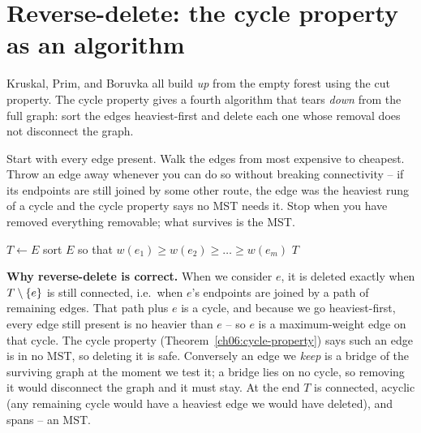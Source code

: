 \section{Reverse-delete: the cycle property as an algorithm}

Kruskal, Prim, and Boruvka all build \emph{up} from the empty forest using the cut property. The cycle property gives a fourth algorithm that tears \emph{down} from the full graph: sort the edges heaviest-first and delete each one whose removal does not disconnect the graph.

\begin{intuitionbox}
Start with every edge present. Walk the edges from most expensive to cheapest. Throw an edge away whenever you can do so without breaking connectivity -- if its endpoints are still joined by some other route, the edge was the heaviest rung of a cycle and the cycle property says no MST needs it. Stop when you have removed everything removable; what survives is the MST.
\end{intuitionbox}

\begin{algorithm}[H]
\caption{Reverse-Delete-MST}
\label{ch06:reverse-delete}
$T\gets E$\;
sort $E$ so that $w(e_1)\ge w(e_2)\ge\dots\ge w(e_m)$\;
\Return $T$\;
\end{algorithm}

\begin{whybox}
\textbf{Why reverse-delete is correct.} When we consider $e$, it is deleted exactly when $T\setminus\{e\}$ is still connected, i.e.\ when $e$'s endpoints are joined by a path of remaining edges. That path plus $e$ is a cycle, and because we go heaviest-first, every edge still present is no heavier than $e$ -- so $e$ is a maximum-weight edge on that cycle. The cycle property (Theorem~\ref{ch06:cycle-property}) says such an edge is in no MST, so deleting it is safe. Conversely an edge we \emph{keep} is a bridge of the surviving graph at the moment we test it; a bridge lies on no cycle, so removing it would disconnect the graph and it must stay. At the end $T$ is connected, acyclic (any remaining cycle would have a heaviest edge we would have deleted), and spans -- an MST.
\end{whybox}


